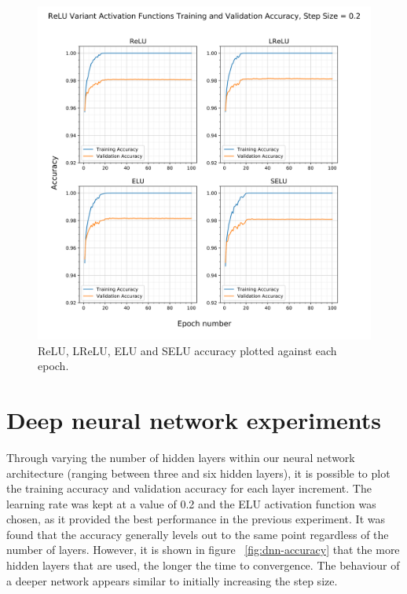 \documentclass{article}
\begin{document}
\begin{figure}[tb]
\vskip 5mm
\begin{center}
\centerline{\includegraphics[width=\columnwidth]{02_relu_variants_accuracy_svg}}
\caption{ReLU, LReLU, ELU and SELU accuracy plotted against each epoch.}
\label{fig:relu-variants-accuracy}
\end{center}
\vskip -5mm
\end{figure}

\section{Deep neural network experiments}
\label{sec:dnnexpts}

Through varying the number of hidden layers within our neural network architecture (ranging between three and six hidden layers), it is possible to plot the training accuracy and validation accuracy for each layer increment. The learning rate was kept at a value of 0.2 and the ELU activation function was chosen, as it provided the best performance in the previous experiment. It was found that the accuracy generally levels out to the same point regardless of the number of layers. However, it is shown in figure ~\ref{fig:dnn-accuracy} that the more hidden layers that are used, the longer the time to convergence. The behaviour of a deeper network appears similar to initially increasing the step size.
\end{document}
